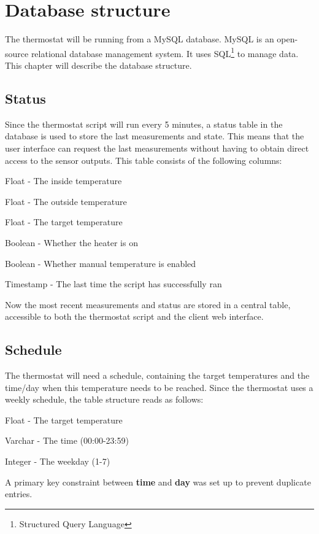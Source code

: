 \documentclass[12pt,a4paper,final]{report}
\begin{document}
\chapter{Database structure} \label{chap:databaseStructure}
The thermostat will be running from a MySQL database. MySQL is an open-source relational database management system. It uses SQL\footnote{Structured Query Language} to manage data\cite{WhatIsMySQL}. This chapter will describe the database structure.

\section*{Status}
Since the thermostat script will run every 5 minutes, a status table in the database is used to store the last measurements and state. This means that the user interface can request the last measurements without having to obtain direct access to the sensor outputs. This table consists of the following columns:
\begin{description} \label{statusCols}
	\item[T] Float -  The inside temperature
	\item[T\_o] Float - The outside temperature
	\item[T\_target] Float -  The target temperature
	\item[Heating] Boolean - Whether the heater is on
	\item[Override] Boolean - Whether manual temperature is enabled
	\item[Last\_update] Timestamp - The last time the script has successfully ran
\end{description}
Now the most recent measurements and status are stored in a central table, accessible to both the thermostat script and the client web interface.

\section*{Schedule}
The thermostat will need a schedule, containing the target temperatures and the time/day when this temperature needs to be reached. Since the thermostat uses a weekly schedule, the table structure reads as follows:
\begin{description} \label{scheduleCols}
	\item[T\_target] Float - The target temperature
	\item[time] Varchar - The time (00:00-23:59)
	\item[day] Integer - The weekday (1-7)
\end{description}
A primary key constraint between \textbf{time} and \textbf{day} was set up to prevent duplicate entries.
\end{document}
